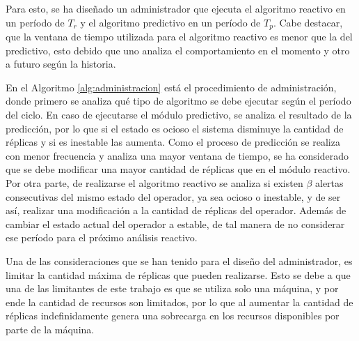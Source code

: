 
\normalsize{Para esto, se ha dise\~nado un administrador que ejecuta el algoritmo reactivo en un per\'iodo de $T_r$ y el algoritmo predictivo en un per\'iodo de $T_p$. Cabe destacar, que la ventana de tiempo utilizada para el algoritmo reactivo es menor que la del predictivo, esto debido que uno analiza el comportamiento en el momento y otro a futuro seg\'un la historia.}

En el Algoritmo \ref{alg:administracion} est\'a el procedimiento de administraci\'on, donde primero se analiza qu\'e tipo de algoritmo se debe ejecutar seg\'un el per\'iodo del ciclo. En caso de ejecutarse el m\'odulo predictivo, se analiza el resultado de la predicci\'on, por lo que si el estado es ocioso el sistema disminuye la cantidad de r\'eplicas y si es inestable las aumenta. Como el proceso de predicci\'on se realiza con menor frecuencia y analiza una mayor ventana de tiempo, se ha considerado que se debe modificar una mayor cantidad de r\'eplicas que en el m\'odulo reactivo. Por otra parte, de realizarse el algoritmo reactivo se analiza si existen $\beta$ alertas consecutivas del mismo estado del operador, ya sea ocioso o inestable, y de ser as\'i, realizar una modificaci\'on a la cantidad de r\'eplicas del operador. Adem\'as de cambiar el estado actual del operador a estable, de tal manera de no considerar ese per\'iodo para el pr\'oximo an\'alisis reactivo.

Una de las consideraciones que se han tenido para el dise\~no del administrador, es limitar la cantidad m\'axima de r\'eplicas que pueden realizarse. Esto se debe a que una de las limitantes de este trabajo es que se utiliza solo una m\'aquina, y por ende la cantidad de recursos son limitados, por lo que al aumentar la cantidad de r\'eplicas indefinidamente genera una sobrecarga en los recursos disponibles por parte de la m\'aquina.

